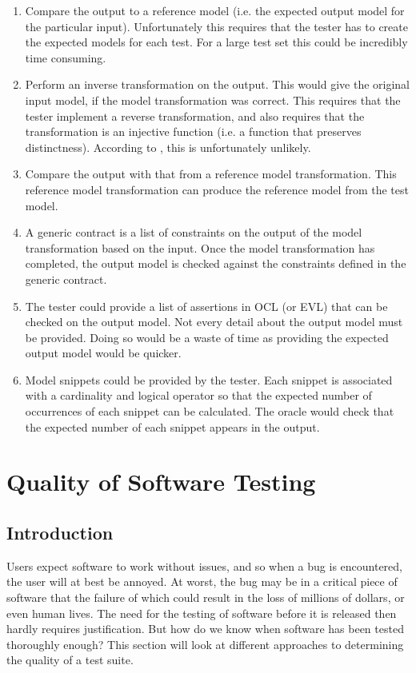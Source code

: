 \begin{enumerate}
	\item Compare the output to a reference model (i.e. the expected output model for the particular input). Unfortunately this requires that the tester has to create the expected models for each test. For a large test set this could be incredibly time consuming.
	\item Perform an inverse transformation on the output. This would give the original input model, if the model transformation was correct. This requires that the tester implement a reverse transformation, and also requires that the transformation is an injective function (i.e. a function that preserves distinctness). According to \citet{mttOracleIssue}, this is unfortunately unlikely.
	\item Compare the output with that from a reference model transformation. This reference model transformation can produce the reference model from the test model. 
	\item A generic contract is a list of constraints on the output of the model transformation based on the input. Once the model transformation has completed, the output model is checked against the constraints defined in the generic contract.
	\item The tester could provide a list of assertions in OCL (or EVL) that can be checked on the output model. Not every detail about the output model must be provided. Doing so would be a waste of time as providing the expected output model would be quicker.
	\item Model snippets could be provided by the tester. Each snippet is associated with a cardinality and logical operator so that the expected number of occurrences of each snippet can be calculated. The oracle would check that the expected number of each snippet appears in the output. 
\end{enumerate}

\section{Quality of Software Testing}
\subsection{Introduction}

Users expect software to work without issues, and so when a bug is encountered, the user will at best be annoyed. At worst, the bug may be in a critical piece of software that the failure of which could result in the loss of millions of dollars, or even human lives. The need for the testing of software before it is released then hardly requires justification. But how do we know when software has been tested thoroughly enough? This section will look at different approaches to determining the quality of a test suite. 


